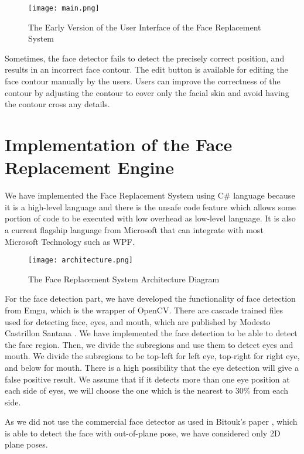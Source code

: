 \begin{figure}[htb]
   \centering
   \texttt{[image: main.png]}
   \caption{The Early Version of the User Interface of the Face Replacement System}
   \label{fig:InterfaceFace}
\end{figure}

Sometimes, the face detector fails to detect the precisely correct position, and results in an incorrect face contour. The edit button is available for editing the face contour manually by the users. Users can improve the correctness of the contour by adjusting the contour to cover only the facial skin and avoid having the contour cross any details.

\section{Implementation of the Face Replacement Engine}

\hspace{0.5in}We have implemented the Face Replacement System using C\# language because it is a high-level language and there is the unsafe code feature which allows some portion of code to be executed with low overhead as low-level language. It is also a current flagship language from Microsoft that can integrate with most Microsoft Technology such as WPF.

\begin{figure}[htb]
   \centering
   \texttt{[image: architecture.png]}
   \caption{The Face Replacement System Architecture Diagram}
   \label{fig:ArchitectureDiagram}
\end{figure}

For the face detection part, we have developed the functionality of face detection from Emgu, which is the wrapper of OpenCV. There are cascade trained files used for detecting face, eyes, and mouth, which are published by Modesto Castrillon Santana \cite{website:ModestoCastrillonSantana}. We have implemented the face detection to be able to detect the face region. Then, we divide the subregions and use them to detect eyes and mouth. We divide the subregions to be top-left for left eye, top-right for right eye, and below for mouth. There is a high possibility that the eye detection will give a false positive result. We assume that if it detects more than one eye position at each side of eyes, we will choose the one which is the nearest to 30\% from each side.

As we did not use the commercial face detector as used in Bitouk's paper \cite{Bitouk2008}, which is able to detect the face with out-of-plane pose, we have considered only 2D plane poses.

